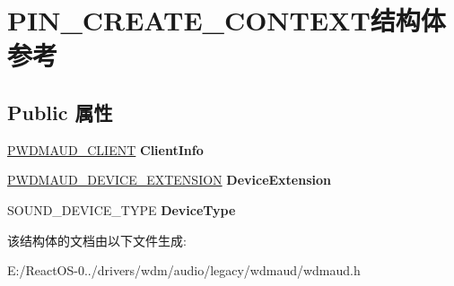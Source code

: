 \hypertarget{struct_p_i_n___c_r_e_a_t_e___c_o_n_t_e_x_t}{}\section{P\+I\+N\+\_\+\+C\+R\+E\+A\+T\+E\+\_\+\+C\+O\+N\+T\+E\+X\+T结构体 参考}
\label{struct_p_i_n___c_r_e_a_t_e___c_o_n_t_e_x_t}
\subsection*{Public 属性}
\begin{DoxyCompactItemize}
\item 
\mbox{\label{struct_p_i_n___c_r_e_a_t_e___c_o_n_t_e_x_t_abdd964f2b4e53ab0120447a593b10a7c}} 
\hyperlink{struct_w_d_m_a_u_d___c_l_i_e_n_t}{P\+W\+D\+M\+A\+U\+D\+\_\+\+C\+L\+I\+E\+NT} {\bfseries Client\+Info}
\item 
\mbox{\label{struct_p_i_n___c_r_e_a_t_e___c_o_n_t_e_x_t_ac6666d9b6fcff44272165d9e7dd4e605}} 
\hyperlink{struct_w_d_m_a_u_d___d_e_v_i_c_e___e_x_t_e_n_s_i_o_n}{P\+W\+D\+M\+A\+U\+D\+\_\+\+D\+E\+V\+I\+C\+E\+\_\+\+E\+X\+T\+E\+N\+S\+I\+ON} {\bfseries Device\+Extension}
\item 
\mbox{\label{struct_p_i_n___c_r_e_a_t_e___c_o_n_t_e_x_t_ae5c11ca6824297bb618c83aaa6ee5203}} 
S\+O\+U\+N\+D\+\_\+\+D\+E\+V\+I\+C\+E\+\_\+\+T\+Y\+PE {\bfseries Device\+Type}
\end{DoxyCompactItemize}


该结构体的文档由以下文件生成\+:\begin{DoxyCompactItemize}
\item 
E\+:/\+React\+O\+S-\/0../drivers/wdm/audio/legacy/wdmaud/wdmaud.\+h\end{DoxyCompactItemize}
